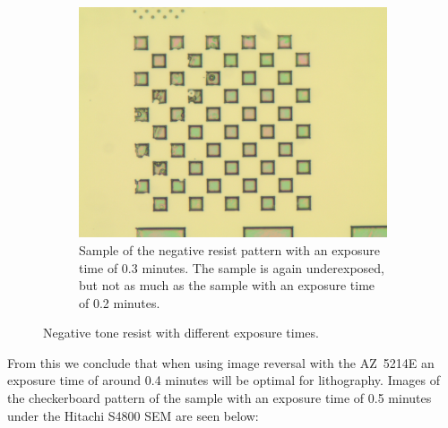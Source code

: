 \begin{figure}[ht]
\begin{subfigure}[t]{0.3\linewidth}
	\label{fig:b2h1}
    \end{subfigure}
    \hfill
    \begin{subfigure}[t]{0.3\linewidth}
        \centering
        \includegraphics[width=\textwidth]{data/b2i1.jpg}
	\caption{Sample of the negative resist pattern with an exposure time of 0.3 minutes. The sample is again underexposed, but not as much as the sample with an exposure time of 0.2 minutes.}
	\label{fig:b2i1}
    \end{subfigure}
    \hfill
    \caption{Negative tone resist with different exposure times.}
\end{figure}



From this we conclude that when using image reversal with the AZ~5214E an exposure time of around 0.4 minutes will be optimal for lithography. Images of the checkerboard pattern of the sample with an exposure time of 0.5 minutes under the Hitachi S4800 SEM are seen below:


%


